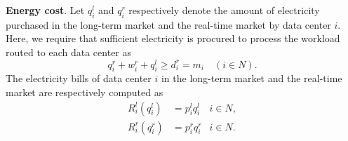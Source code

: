









\textbf{Energy cost}. Let $q^l_i$ and ${q}_i^r$ respectively denote the amount of electricity purchased in the long-term market and the real-time market by data center $i.$ Here, we require that sufficient electricity is procured to process the workload routed to each data center as $$q^r_i + w^r_i + q^l_i \geq d^r_i = m_i \quad (i \in
N).$$
The electricity bills of data center $i$ in the long-term market and the real-time market are respectively computed as
\begin{align*}
R^l_i(q^l_i) &= p^l_i q^l_i & i\in N, \\
R^r_i(q^r_i) &= {p}_i^r q^r_i & i \in N.
\end{align*}

